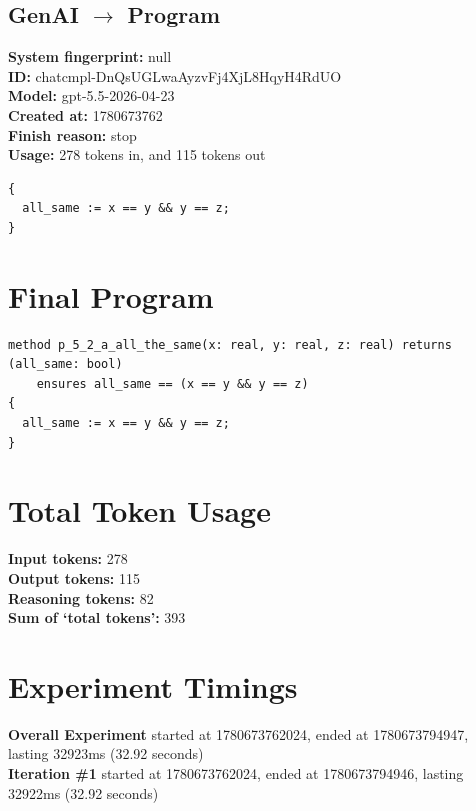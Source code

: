 \documentclass{article}
\begin{document}
\subsection*{GenAI $\rightarrow$ Program}
\textbf{System fingerprint: }null
\\\textbf{ID: }chatcmpl-DnQsUGLwaAyzvFj4XjL8HqyH4RdUO
\\\textbf{Model: }gpt-5.5-2026-04-23
\\\textbf{Created at: }1780673762
\\\textbf{Finish reason: }stop
\\\textbf{Usage: }278 tokens in, and 115 tokens out
\begin{lstlisting}
{
  all_same := x == y && y == z;
}
\end{lstlisting}
\section*{Final Program}
\begin{lstlisting}
method p_5_2_a_all_the_same(x: real, y: real, z: real) returns (all_same: bool)
	ensures all_same == (x == y && y == z)
{
  all_same := x == y && y == z;
}
\end{lstlisting}
\section*{Total Token Usage}
\textbf{Input tokens: }278
\\\textbf{Output tokens: }115
\\\textbf{Reasoning tokens: }82
\\\textbf{Sum of `total tokens': }393
\section*{Experiment Timings}
\textbf{Overall Experiment} started at 1780673762024, ended at 1780673794947, lasting 32923ms (32.92 seconds)
\\\textbf{Iteration \#1} started at 1780673762024, ended at 1780673794946, lasting 32922ms (32.92 seconds)
\end{document}
